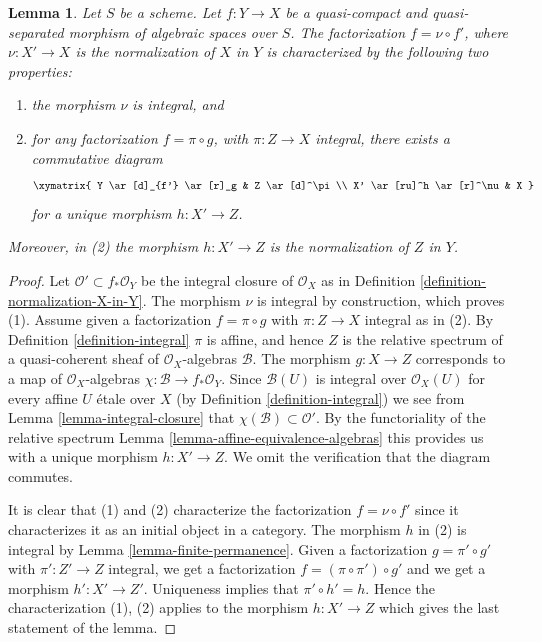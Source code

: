 \documentclass{stacks-project}
\theoremstyle{plain}
\newtheorem{lemma}[subsection]{Lemma}
\theoremstyle{definition}
\theoremstyle{remark}
\numberwithin{equation}{subsection}
\begin{document}
\begin{lemma}
\label{lemma-characterize-normalization}
Let $S$ be a scheme. Let $f : Y \to X$ be a quasi-compact and quasi-separated
morphism of algebraic spaces over $S$. The factorization $f = \nu \circ f'$,
where $\nu : X' \to X$ is the normalization of $X$ in $Y$ is characterized
by the following two properties:
\begin{enumerate}
\item the morphism $\nu$ is integral, and
\item for any factorization $f = \pi \circ g$, with $\pi : Z \to X$
integral, there exists a commutative diagram
$$
\xymatrix{
Y \ar[d]_{f'} \ar[r]_g & Z \ar[d]^\pi \\
X' \ar[ru]^h \ar[r]^\nu & X
}
$$
for a unique morphism $h : X' \to Z$.
\end{enumerate}
Moreover, in (2) the morphism $h : X' \to Z$ is the normalization of
$Z$ in $Y$.
\end{lemma}

\begin{proof}
Let $\mathcal{O}' \subset f_*\mathcal{O}_Y$ be the integral closure of
$\mathcal{O}_X$ as in Definition \ref{definition-normalization-X-in-Y}.
The morphism $\nu$ is integral by construction, which proves (1).
Assume given a factorization $f = \pi \circ g$ with $\pi : Z \to X$
integral as in (2). By Definition \ref{definition-integral}
$\pi$ is affine, and hence $Z$ is the relative
spectrum of a quasi-coherent sheaf of $\mathcal{O}_X$-algebras $\mathcal{B}$.
The morphism $g : X \to Z$ corresponds to a map of $\mathcal{O}_X$-algebras
$\chi : \mathcal{B} \to f_*\mathcal{O}_Y$. Since $\mathcal{B}(U)$ is
integral over $\mathcal{O}_X(U)$ for every affine $U$ \'etale over $X$
(by Definition \ref{definition-integral})
we see from Lemma \ref{lemma-integral-closure}
that $\chi(\mathcal{B}) \subset \mathcal{O}'$.
By the functoriality of the relative spectrum
Lemma \ref{lemma-affine-equivalence-algebras}
this provides us with a unique morphism
$h : X' \to Z$. We omit the verification that the diagram commutes.

\medskip\noindent
It is clear that (1) and (2) characterize the
factorization $f = \nu \circ f'$ since it characterizes it
as an initial object in a category. The morphism $h$ in (2)
is integral by Lemma \ref{lemma-finite-permanence}.
Given a factorization $g = \pi' \circ g'$ with $\pi' : Z' \to Z$
integral, we get a factorization $f = (\pi \circ \pi') \circ g'$ and
we get a morphism $h' : X' \to Z'$. Uniqueness implies that
$\pi' \circ h' = h$. Hence the characterization (1), (2) applies
to the morphism $h : X' \to Z$ which gives the last statement of the lemma.
\end{proof}
\end{document}
